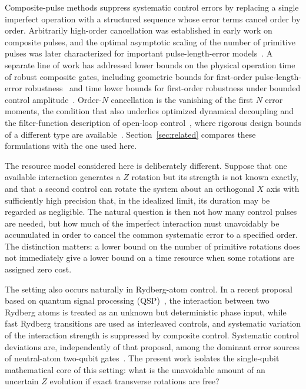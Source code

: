 \documentclass[%
  aps,
  pra,
  preprint,
  superscriptaddress,
  amsmath,amssymb,
  nofootinbib,
  floatfix,
]{revtex4-2}
\theoremstyle{definition}
\theoremstyle{remark}
\begin{document}
Composite-pulse methods suppress systematic control errors by replacing a single imperfect
operation with a structured sequence whose error terms cancel order by order. Arbitrarily
high-order cancellation was established in early work on composite pulses, and the optimal
asymptotic scaling of the number of primitive pulses was later characterized for important
pulse-length-error models~\cite{Brown2004,Merrill2014,Low2014}. A separate line of work has
addressed lower bounds on the physical operation time of robust composite gates, including
geometric bounds for first-order pulse-length-error robustness~\cite{Kukita2023} and time
lower bounds for first-order robustness under bounded control amplitude~\cite{Zeng2025,Kosut2025}.
Order-$N$ cancellation is the vanishing of the first $N$ error moments, the condition that
also underlies optimized dynamical decoupling and the filter-function description of
open-loop control~\cite{Kabytayev2014,Uhrig2007,PazSilva2014}, where rigorous design bounds
of a different type are available~\cite{UhrigLidar2010,Khodjasteh2011,NgLidarPreskill2011}.
Section~\ref{sec:related} compares these formulations with the one used here.

The resource model considered here is deliberately different. Suppose that one available
interaction generates a $Z$ rotation but its strength is not known exactly, and that a second
control can rotate the system about an orthogonal $X$ axis with sufficiently high precision
that, in the idealized limit, its duration may be regarded as negligible. The natural
question is then not how many control pulses are needed, but how much of the imperfect
interaction must unavoidably be accumulated in order to cancel the common systematic error to
a specified order. The distinction matters: a lower bound on the number of primitive
rotations does not immediately give a lower bound on a time resource when some rotations are
assigned zero cost.

The setting also occurs naturally in Rydberg-atom control. In a recent proposal based on
quantum signal processing (QSP)~\cite{Ye2026}, the interaction between two Rydberg atoms is treated as an unknown but
deterministic phase input, while fast Rydberg transitions are used as interleaved controls,
and systematic variation of the interaction strength is suppressed by composite control.
Systematic control deviations are, independently of that proposal, among the dominant error
sources of neutral-atom two-qubit gates~\cite{Evered2023,Mohan2023}. The present work isolates
the single-qubit mathematical core of this setting: what is the unavoidable amount of an
uncertain $Z$ evolution if exact transverse rotations are free?
\end{document}
